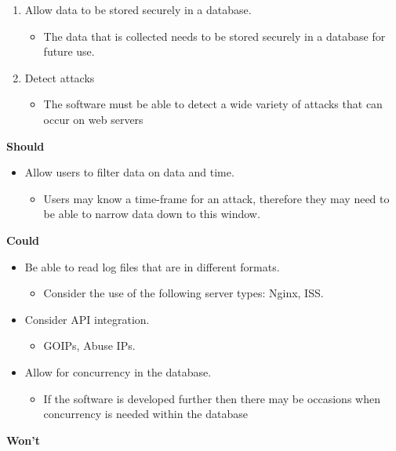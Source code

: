 \begin{enumerate}
\begin{itemize}
    \end{itemize}
        \item Allow data to be stored securely in a database.
    \begin{itemize}
        \item The data that is collected needs to be stored securely in a database for future use.
    \end{itemize}
    \item Detect attacks
    \begin{itemize}
        \item The software must be able to detect a wide variety of attacks that can occur on web servers
    \end{itemize}
\end{enumerate}

\textbf{Should}
\begin{itemize}
    \item Allow users to filter data on data and time.
    \begin{itemize}
        \item Users may know a time-frame for an attack, therefore they may need to be able to narrow data down to this window.
    \end{itemize}
\end{itemize}
\textbf{Could}
\begin{itemize}
\item Be able to read log files that are in different formats.
    \begin{itemize}
        \item Consider the use of the following server types: Nginx, ISS.
    \end{itemize}
    \item Consider API integration.
    \begin{itemize}
        \item GOIPs, Abuse IPs.
    \end{itemize}
    \item Allow for concurrency in the database.
    \begin{itemize}
        \item If the software is developed further then there may be occasions when concurrency is needed within the database
    \end{itemize}
    
    \end{itemize}
\textbf{Won't}
